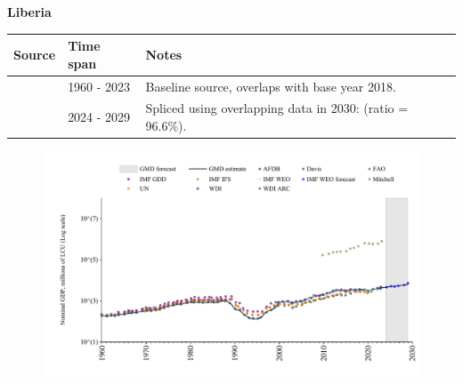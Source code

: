 \documentclass[12pt,a4paper,landscape]{article}
\begin{document}
\begin{adjustbox}{max totalsize={\paperwidth}{\paperheight},center}
\begin{minipage}[t][\textheight][t]{\textwidth}
\vspace*{0.5cm}
{}
\begin{center}
{\Large\bfseries Liberia}
\end{center}
\vspace{0.5cm}
\begin{table}[H]
\centering
\small
\begin{tabular}{|l|l|l|}
\hline
\textbf{Source} & \textbf{Time span} & \textbf{Notes} \\
\hline
\rowcolor{white}\cite{WDI}& 1960 - 2023 &Baseline source, overlaps with base year 2018.\\
\rowcolor{lightgray}\cite{IMF_WEO_forecast}& 2024 - 2029 &Spliced using overlapping data in 2030: (ratio = 96.6\%).\\
\hline
\end{tabular}
\end{table}
\begin{figure}[H]
\centering
\includegraphics[width=\textwidth,height=0.6\textheight,keepaspectratio]{graphs/LBR_nGDP.pdf}
\end{figure}
\end{minipage}
\end{adjustbox}
\end{document}

